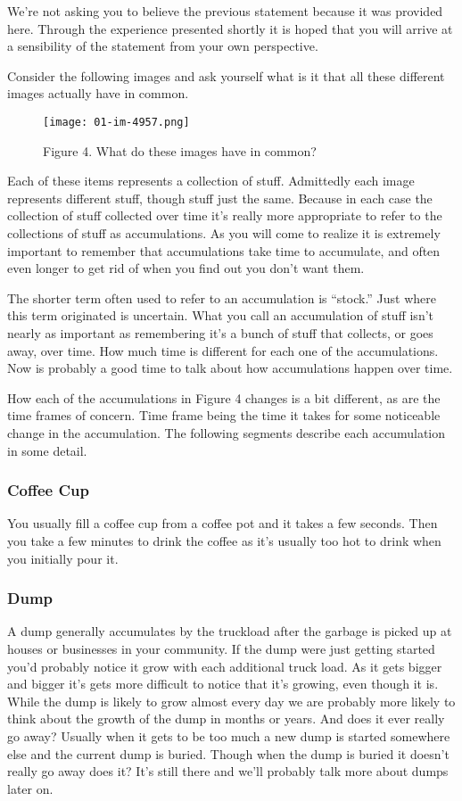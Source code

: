 \documentclass[]{memoir}
\makeatletter
\def\maxwidth{\ifdim\Gin@nat@width>\linewidth\linewidth
\else\Gin@nat@width\fi}
\let\Oldincludegraphics\includegraphics
\renewcommand{\includegraphics}[1]{\Oldincludegraphics[width=\maxwidth]{#1}}
\makeatother
\begin{document}
We're not asking you to believe the previous statement because it was
provided here. Through the experience presented shortly it is hoped that
you will arrive at a sensibility of the statement from your own
perspective.

Consider the following images and ask yourself what is it that all these
different images actually have in common.

\begin{figure}[htbp]
\centering
\texttt{[image: 01-im-4957.png]}
\caption{Figure 4. What do these images have in common?}
\end{figure}

Each of these items represents a collection of stuff. Admittedly each
image represents different stuff, though stuff just the same. Because in
each case the collection of stuff collected over time it's really more
appropriate to refer to the collections of stuff as accumulations. As
you will come to realize it is extremely important to remember that
accumulations take time to accumulate, and often even longer to get rid
of when you find out you don't want them.

The shorter term often used to refer to an accumulation is ``stock.''
Just where this term originated is uncertain. What you call an
accumulation of stuff isn't nearly as important as remembering it's a
bunch of stuff that collects, or goes away, over time. How much time is
different for each one of the accumulations. Now is probably a good time
to talk about how accumulations happen over time.

How each of the accumulations in Figure 4 changes is a bit different, as
are the time frames of concern. Time frame being the time it takes for
some noticeable change in the accumulation. The following segments
describe each accumulation in some detail.

\subsubsection{Coffee Cup}

You usually fill a coffee cup from a coffee pot and it takes a few
seconds. Then you take a few minutes to drink the coffee as it's usually
too hot to drink when you initially pour it.

\subsubsection{Dump}

A dump generally accumulates by the truckload after the garbage is
picked up at houses or businesses in your community. If the dump were
just getting started you'd probably notice it grow with each additional
truck load. As it gets bigger and bigger it's gets more difficult to
notice that it's growing, even though it is. While the dump is likely to
grow almost every day we are probably more likely to think about the
growth of the dump in months or years. And does it ever really go away?
Usually when it gets to be too much a new dump is started somewhere else
and the current dump is buried. Though when the dump is buried it
doesn't really go away does it? It's still there and we'll probably talk
more about dumps later on.
\end{document}

